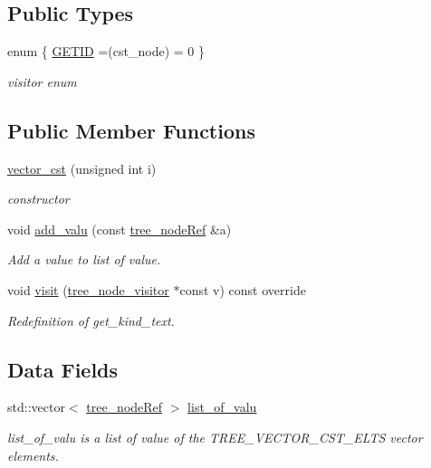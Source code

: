 \subsection*{Public Types}
\begin{DoxyCompactItemize}
\item 
enum \{ \hyperlink{structvector__cst_a3357a1249410327c21c68ab421cc4b63ad2feab60e6a7fb750d3465cd7f87ec80}{G\+E\+T\+ID} =(cst\+\_\+node) = 0
 \}\begin{DoxyCompactList}\small\item\em visitor enum \end{DoxyCompactList}
\end{DoxyCompactItemize}
\subsection*{Public Member Functions}
\begin{DoxyCompactItemize}
\item 
\hyperlink{structvector__cst_a001207e99c4e6c19540a96a733a362b4}{vector\+\_\+cst} (unsigned int i)
\begin{DoxyCompactList}\small\item\em constructor \end{DoxyCompactList}\item 
void \hyperlink{structvector__cst_ac300220027f55ae8727f2942088ef792}{add\+\_\+valu} (const \hyperlink{tree__node_8hpp_a6ee377554d1c4871ad66a337eaa67fd5}{tree\+\_\+node\+Ref} \&a)
\begin{DoxyCompactList}\small\item\em Add a value to list of value. \end{DoxyCompactList}\item 
void \hyperlink{structvector__cst_a6efa88e172cac566dcfb5fd0a04ff947}{visit} (\hyperlink{classtree__node__visitor}{tree\+\_\+node\+\_\+visitor} $\ast$const v) const override
\begin{DoxyCompactList}\small\item\em Redefinition of get\+\_\+kind\+\_\+text. \end{DoxyCompactList}\end{DoxyCompactItemize}
\subsection*{Data Fields}
\begin{DoxyCompactItemize}
\item 
std\+::vector$<$ \hyperlink{tree__node_8hpp_a6ee377554d1c4871ad66a337eaa67fd5}{tree\+\_\+node\+Ref} $>$ \hyperlink{structvector__cst_a841a74bdf5cfa9227a30dc1f6b6dfe7e}{list\+\_\+of\+\_\+valu}
\begin{DoxyCompactList}\small\item\em list\+\_\+of\+\_\+valu is a list of value of the T\+R\+E\+E\+\_\+\+V\+E\+C\+T\+O\+R\+\_\+\+C\+S\+T\+\_\+\+E\+L\+TS vector elements. \end{DoxyCompactList}\end{DoxyCompactItemize}
